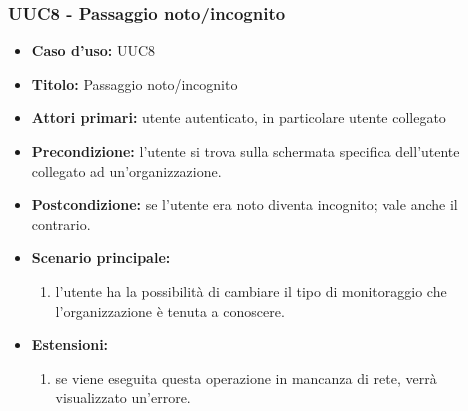 \documentclass[casi-duso]{subfiles}
\begin{document}
\subsubsection{UUC8 - Passaggio noto/incognito}
\label{subsub:UUC8utente}
\begin{itemize}
  \item \textbf{Caso d’uso:} UUC8
  \item \textbf{Titolo:} Passaggio noto/incognito
  \item \textbf{Attori primari:} utente autenticato, in particolare utente collegato
  \item \textbf{Precondizione:} l'utente si trova sulla schermata specifica dell'utente collegato ad un'organizzazione.
  \item \textbf{Postcondizione:} se l'utente era noto diventa incognito; vale anche il contrario.
  \item \textbf{Scenario principale:} 
  \begin{enumerate}
    \item l'utente ha la possibilità di cambiare il tipo di monitoraggio che l'organizzazione è tenuta a conoscere.
  \end{enumerate}  
  \item \textbf{Estensioni:} 
  \begin{enumerate}
    \item se viene eseguita questa operazione in mancanza di rete, verrà visualizzato un'errore. 
  \end{enumerate}  
\end{itemize}

\end{document}

